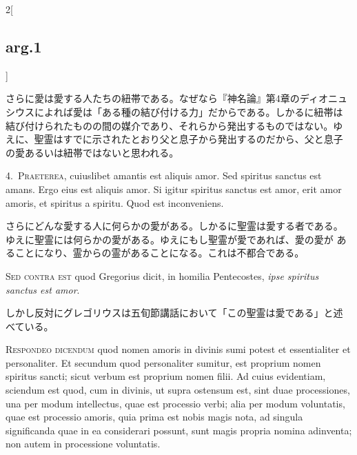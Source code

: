 \documentclass[paper=a4paper,fontsize=10pt,jafontsize=9pt,titlepage]{jlreq}
\begin{document}
\begin{paracol}{2}[\subsection{arg.1}]
\switchcolumn

さらに愛は愛する人たちの紐帯である。なぜなら『神名論』第4章のディオニュ
シウスによれば愛は「ある種の結び付ける力」だからである。しかるに紐帯は
結び付けられたものの間の媒介であり、それらから発出するものではない。ゆ
えに、聖霊はすでに示されたとおり父と息子から発出するのだから、父と息子
の愛あるいは紐帯ではないと思われる。


4.~{\scshape Praeterea}, cuiuslibet amantis est aliquis amor. Sed spiritus sanctus
est amans. Ergo eius est aliquis amor. Si igitur spiritus sanctus est
amor, erit amor amoris, et spiritus a spiritu. Quod est inconveniens.

\switchcolumn

さらにどんな愛する人に何らかの愛がある。しかるに聖霊は愛する者である。
 ゆえに聖霊には何らかの愛がある。ゆえにもし聖霊が愛であれば、愛の愛が
 あることになり、霊からの霊があることになる。これは不都合である。

\switchcolumn*[\subsection{s.c.}]

{\scshape Sed contra est} quod Gregorius dicit, in homilia Pentecostes, {\itshape ipse
spiritus sanctus est amor}.

\switchcolumn

しかし反対にグレゴリウスは五旬節講話において「この聖霊は愛である」と述
べている。


{\scshape Respondeo dicendum} quod nomen amoris in divinis sumi potest et
essentialiter et personaliter. Et secundum quod personaliter sumitur,
est proprium nomen spiritus sancti; sicut verbum est proprium nomen
filii. Ad cuius evidentiam, sciendum est quod, cum in divinis, ut
supra ostensum est, sint duae processiones, una per modum intellectus,
quae est processio verbi; alia per modum voluntatis, quae est
processio amoris, quia prima est nobis magis nota, ad singula
significanda quae in ea considerari possunt, sunt magis propria nomina
adinventa; non autem in processione voluntatis.


\end{paracol}
\end{document}
